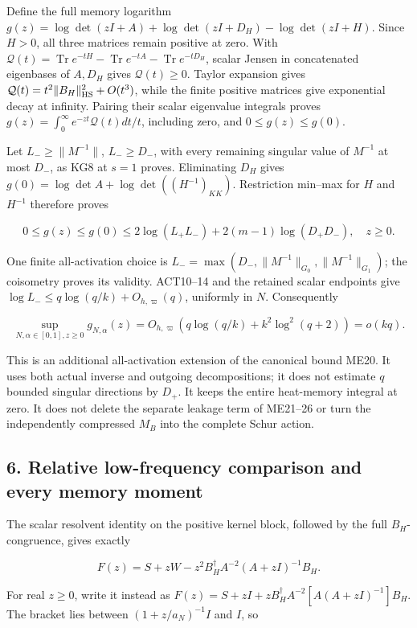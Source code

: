 \documentclass[11pt]{article}
\begin{document}
Define the full memory logarithm \(g(z)=\log\det(zI+A)+\log\det(zI+D_H)-\log\det(zI+H)\). Since \(H>0\), all three matrices remain positive at zero. With \(\mathcal Q(t)=\operatorname{Tr}e^{-tH}-\operatorname{Tr}e^{-tA}-\operatorname{Tr}e^{-tD_H}\), scalar Jensen in concatenated eigenbases of \(A,D_H\) gives \(\mathcal Q(t)\ge0\). Taylor expansion gives \(\mathcal Q(t)=t^2\|B_H\|_{\rm HS}^2+O(t^3)\), while the finite positive matrices give exponential decay at infinity. Pairing their scalar eigenvalue integrals proves \(g(z)=\int_0^\infty e^{-zt}\mathcal Q(t)dt/t\), including zero, and \(0\le g(z)\le g(0)\).

Let \(L_-\ge\|M^{-1}\|\), \(L_-\ge D_-\), with every remaining singular value of \(M^{-1}\) at most \(D_-\), as KG8 at \(s=1\) proves. Eliminating \(D_H\) gives \(g(0)=\log\det A+\log\det((H^{-1})_{KK})\). Restriction min--max for \(H\) and \(H^{-1}\) therefore proves

\[
\boxed{0\le g(z)\le g(0)
\le2\log(L_+L_-)+2(m-1)\log(D_+D_-),\quad z\ge0.}
\tag{KG23}
\]

One finite all-activation choice is \(L_-=\max(D_-,\|M^{-1}\|_{G_0},\|M^{-1}\|_{G_1})\); the coisometry proves its validity. ACT10--14 and the retained scalar endpoints give \(\log L_-\le q\log(q/k)+O_{h,\varpi}(q)\), uniformly in \(N\). Consequently

\[
\boxed{\sup_{N,\alpha\in[0,1],z\ge0}g_{N,\alpha}(z)
=O_{h,\varpi}(q\log(q/k)+k^2\log^2(q+2))=o(kq).}
\tag{KG24}
\]

This is an additional all-activation extension of the canonical bound ME20. It uses both actual inverse and outgoing decompositions; it does not estimate \(q\) bounded singular directions by \(D_+\). It keeps the entire heat-memory integral at zero. It does not delete the separate leakage term of ME21--26 or turn the independently compressed \(M_B\) into the complete Schur action.

\subsection{6. Relative low-frequency comparison and every memory moment}\label{relative-low-frequency-comparison-and-every-memory-moment}

The scalar resolvent identity on the positive kernel block, followed by the full \(B_H\)-congruence, gives exactly

\[
F(z)=S+zW-z^2B_H^\dagger A^{-2}(A+zI)^{-1}B_H.
\tag{KG25}
\]

For real \(z\ge0\), write it instead as \(F(z)=S+zI+zB_H^\dagger A^{-2}[A(A+zI)^{-1}]B_H\). The bracket lies between \((1+z/a_N)^{-1}I\) and \(I\), so
\end{document}
